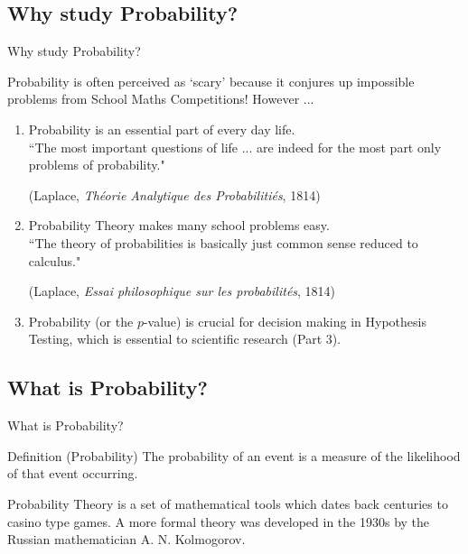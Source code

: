\documentclass[t,xcolor=pdftex,dvipsnames,table]{beamer}\usepackage[]{graphicx}\usepackage[]{color}
\begin{document}
\subsection[]{Why study Probability?}
\begin{frame}{Why study Probability?}

Probability is often perceived as ‘scary’ because it conjures up impossible problems from School Maths Competitions! However ...

\begin{enumerate}
\item Probability is an essential part of every day life.  \\
 ``The most important questions of life ... are indeed for the most part only problems of probability."
 
 {\tiny (Laplace, {\it Théorie Analytique des Probabilitiés}, 1814)}
\href{http://bayes.wustl.edu/Manual/laplace_A_philosophical_essay_on_probabilities.pdf}{}

\item 
Probability Theory makes many school problems easy. \\
``The theory of probabilities is basically just common sense reduced to calculus." 

{\tiny (Laplace, {\it Essai philosophique sur les probabilités},  1814)}
\href{http://archive.org/details/essaiphilosophiq00lapluoft}{}

\item Probability (or the $p$-value) is crucial for decision making in Hypothesis Testing, which is essential to scientific research (Part 3).
\end{enumerate}
\end{frame}


\subsection[]{What is Probability?}
\begin{frame}{What is Probability?}

\begin{block}{Definition (Probability)}
The probability of an event is a measure of the likelihood of that event occurring. 
\end{block}


\vspace{.5cm}
Probability Theory is a set of mathematical tools which dates back centuries to casino type games. A more formal theory was developed in the 1930s by the Russian mathematician A. N. Kolmogorov.
\href{http://www.youtube.com/watch?v=2y3PH4SqmlA}{}
\hyperlink{Appendix1}{}
\end{frame}
\end{document}
